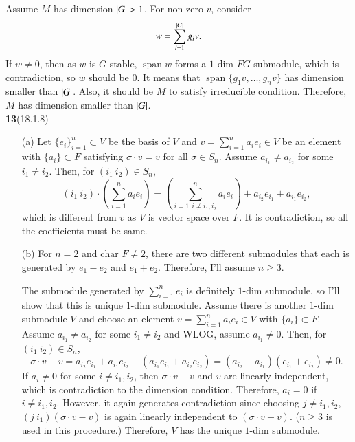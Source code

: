 \documentclass[a4paper, 12pt]{article}
\theoremstyle{Mydefinition}
\theoremstyle{Mytheorem}
\DeclareMathOperator{\spn}{span}
\begin{document}
Assume $M$ has dimension $\abs{G}>1$. For non-zero $v$, consider
\begin{equation}
    w = \sum_{i=1}^{\abs{G}} g_i v.
\end{equation}
If $w\neq 0$, then as $w$ is $G$-stable, $\spn w$ forms a $1$-dim $FG$-submodule, which is contradiction, so $w$ should be $0$. It means that $\spn \{g_1v, \ldots, g_n v\}$ has dimension smaller than $\abs{G}$. Also, it should be $M$ to satisfy irreducible condition. Therefore, $M$ has dimension smaller than $\abs{G}$.\\

\noindent \textbf{13}(18.1.8)
\begin{enumerate}
    \item[(a)] Let $\{e_i\}_{i=1}^n\subset V$ be the basis of $V$ and $v=\sum_{i=1}^n a_i e_i\in V$ be an element with $\{a_i\}\subset F$ satisfying $\sigma\cdot v =v$ for all $\sigma\in S_n$. Assume $a_{i_1}\neq a_{i_2}$ for some $i_1\neq i_2$. Then, for $(i_1~i_2)\in S_n$,
\begin{equation}
    (i_1~i_2)\cdot \left(\sum_{i=1}^n a_i e_i\right) = \left(\sum_{i=1, i\neq i_1,i_2}^n a_i e_i\right) + a_{i_2}e_{i_1}+a_{i_1}e_{i_2},
\end{equation}
which is different from $v$ as $V$ is vector space over $F$. It is contradiction, so all the coefficients must be same.
    \item[(b)] For $n=2$ and $\textrm{char } F\neq 2$, there are two different submodules that each is generated by $e_1-e_2$ and $e_1+e_2$. Therefore, I'll assume $n\geq 3$.
    
    The submodule generated by $\sum_{i=1}^n e_i$ is definitely $1$-dim submodule, so I'll show that this is unique $1$-dim submodule. Assume there is another $1$-dim submodule $V$ and choose an element $v = \sum_{i=1}^n a_i e_i\in V$ with $\{a_i\}\subset F$. Assume $a_{i_1}\neq a_{i_2}$ for some $i_1\neq i_2$ and WLOG, assume $a_{i_1} \neq 0$. Then, for $(i_1~i_2)\in S_n$,
    \begin{equation}
        \sigma \cdot v - v = a_{i_2}e_{i_1}+a_{i_1}e_{i_2} - \left(a_{i_1}e_{i_1}+a_{i_2}e_{i_2}\right) = (a_{i_2}-a_{i_1})(e_{i_1}+e_{i_2})\neq 0.
    \end{equation}
    If $a_i\neq 0$ for some $i\neq i_1,i_2$, then $\sigma \cdot v - v$ and $v$ are linearly independent, which is contradiction to the dimension condition. Therefore, $a_i=0$ if $i\neq i_1,i_2$. However, it again generates contradiction since choosing $j\neq i_1,i_2$, $(j~i_1)(\sigma \cdot v - v)$ is again linearly independent to $(\sigma\cdot v - v)$. ($n\geq 3$ is used in this procedure.) Therefore, $V$ has the unique $1$-dim submodule.
\end{enumerate}

\end{document}
